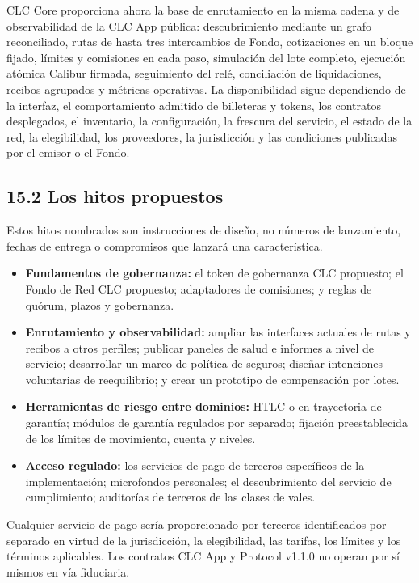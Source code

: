 \documentclass[11pt]{article}
\begin{document}
CLC Core proporciona ahora la base de enrutamiento en la misma cadena y de observabilidad de la CLC App pública: descubrimiento mediante un grafo reconciliado, rutas de hasta tres intercambios de Fondo, cotizaciones en un bloque fijado, límites y comisiones en cada paso, simulación del lote completo, ejecución atómica Calibur firmada, seguimiento del relé, conciliación de liquidaciones, recibos agrupados y métricas operativas. La disponibilidad sigue dependiendo de la interfaz, el comportamiento admitido de billeteras y tokens, los contratos desplegados, el inventario, la configuración, la frescura del servicio, el estado de la red, la elegibilidad, los proveedores, la jurisdicción y las condiciones publicadas por el emisor o el Fondo.

\subsection*{15.2 Los hitos propuestos}

Estos hitos nombrados son instrucciones de diseño, no números de lanzamiento, fechas de entrega o compromisos que lanzará una característica.

\begin{itemize}[leftmargin=*]
\item \textbf{Fundamentos de gobernanza:} el token de gobernanza CLC propuesto; el Fondo de Red CLC propuesto; adaptadores de comisiones; y reglas de quórum, plazos y gobernanza.
\item \textbf{Enrutamiento y observabilidad:} ampliar las interfaces actuales de rutas y recibos a otros perfiles; publicar paneles de salud e informes a nivel de servicio; desarrollar un marco de política de seguros; diseñar intenciones voluntarias de reequilibrio; y crear un prototipo de compensación por lotes.
\item \textbf{Herramientas de riesgo entre dominios:} HTLC o en trayectoria de garantía; módulos de garantía regulados por separado; fijación preestablecida de los límites de movimiento, cuenta y niveles.
\item \textbf{Acceso regulado:} los servicios de pago de terceros específicos de la implementación; microfondos personales; el descubrimiento del servicio de cumplimiento; auditorías de terceros de las clases de vales.
\end{itemize}
Cualquier servicio de pago sería proporcionado por terceros identificados por separado en virtud de la jurisdicción, la elegibilidad, las tarifas, los límites y los términos aplicables. Los contratos CLC App y Protocol v1.1.0 no operan por sí mismos en vía fiduciaria.
\end{document}
